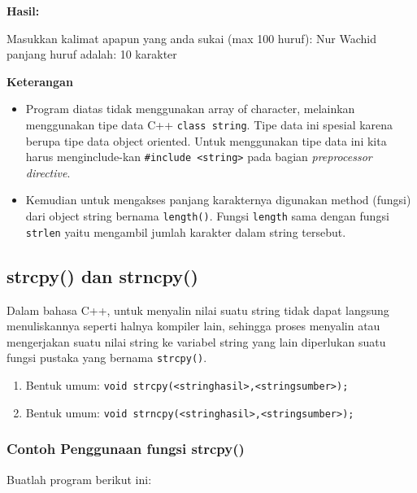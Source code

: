 \textbf{Hasil:}

\begin{lcverbatim}
Masukkan kalimat apapun yang anda sukai
(max 100 huruf): Nur Wachid 
panjang huruf adalah: 10 karakter
\end{lcverbatim}
 

\textbf{Keterangan}

\begin{itemize}

\item
  Program diatas tidak menggunakan array of character, melainkan
  menggunakan tipe data C++ \texttt{class\ string}. Tipe data ini
  spesial karena berupa tipe data object oriented. Untuk menggunakan
  tipe data ini kita harus menginclude-kan
  \texttt{\#include\ \textless{}string\textgreater{}} pada bagian
  \emph{preprocessor directive}.
\item
  Kemudian untuk mengakses panjang karakternya digunakan method (fungsi)
  dari object string bernama \texttt{length()}. Fungsi \texttt{length}
  sama dengan fungsi \texttt{strlen} yaitu mengambil jumlah karakter
  dalam string tersebut.
\end{itemize}

\subsection{strcpy() dan strncpy()}\label{strcpy-dan-strncpy}

Dalam bahasa C++, untuk menyalin nilai suatu string tidak dapat langsung
menuliskannya seperti halnya kompiler lain, sehingga proses menyalin
atau mengerjakan suatu nilai string ke variabel string yang lain
diperlukan suatu fungsi pustaka yang bernama \texttt{strcpy()}.

\begin{enumerate}

\item
  Bentuk umum:
  \texttt{void\ strcpy(\textless{}stringhasil\textgreater{},\textless{}stringsumber\textgreater{});}
\item
  Bentuk umum:
  \texttt{void\ strncpy(\textless{}stringhasil\textgreater{},\textless{}stringsumber\textgreater{});}
\end{enumerate}

\subsubsection*{Contoh  Penggunaan fungsi strcpy()}

Buatlah program berikut ini:

